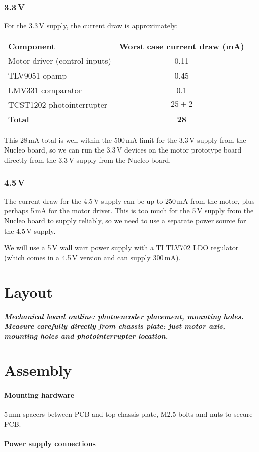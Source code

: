 \documentclass[a4paper,11pt,article]{memoir}
\newcommand{\todo}[1]{{\color{red}\textit{\textbf{#1}}}}
\begin{document}
\subsubsection{3.3\,V}

For the 3.3\,V supply, the current draw is approximately:

\begin{center}
  \begin{tabular}{lc}
    \textbf{Component} & \textbf{Worst case current draw (mA)} \\
    Motor driver (control inputs) & 0.11 \\
    TLV9051 opamp & 0.45 \\
    LMV331 comparator & 0.1 \\
    TCST1202 photointerrupter & $25 + 2$ \\
    \textbf{Total} & \textbf{28} \\
  \end{tabular}
\end{center}

This 28\,mA total is well within the 500\,mA limit for the 3.3\,V
supply from the Nucleo board, so we can run the 3.3\,V devices on the
motor prototype board directly from the 3.3\,V supply from the Nucleo board.

\subsubsection{4.5\,V}

The current draw for the 4.5\,V supply can be up to 250\,mA from the
motor, plus perhaps 5\,mA for the motor driver. This is too much for
the 5\,V supply from the Nucleo board to supply reliably, so we need
to use a separate power source for the 4.5\,V supply.

We will use a 5\,V wall wart power supply with a TI TLV702 LDO
regulator (which comes in a 4.5\,V version and can supply 300\,mA).


\section{Layout}

\todo{Mechanical board outline: photoencoder placement, mounting
  holes. Measure carefully directly from chassis plate: just motor
  axis, mounting holes and photointerrupter location.}


\section{Assembly}

\paragraph{Mounting hardware}

5\,mm spacers between PCB and top chassis plate, M2.5 bolts and nuts
to secure PCB.

\paragraph{Power supply connections}
\end{document}
